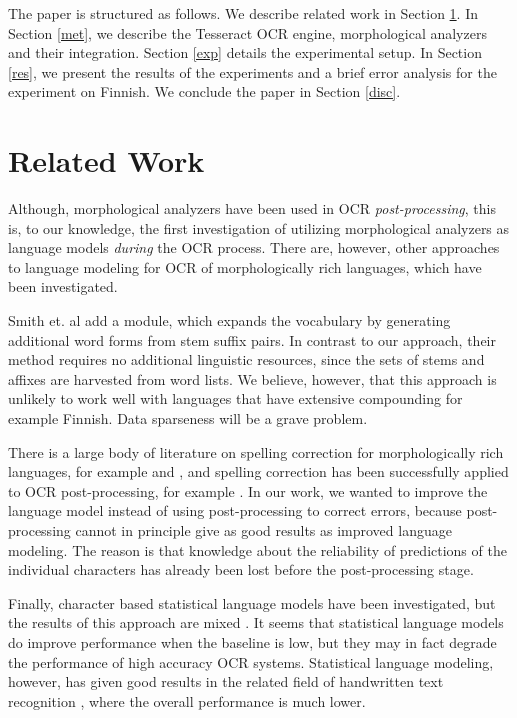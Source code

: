 \documentclass[b5paper]{article}
\begin{document}
The paper is structured as follows. We describe related work in
Section \ref{rel}. In Section \ref{met}, we describe the Tesseract OCR
engine, morphological analyzers and their integration. Section
\ref{exp} details the experimental setup. In Section \ref{res}, we
present the results of the experiments and a brief error analysis for
the experiment on Finnish. We conclude the paper in Section
\ref{disc}.

\section{Related Work}
\label{rel}
Although, morphological analyzers have been used in OCR {\it
  post-processing}, this is, to our knowledge, the first investigation
of utilizing morphological analyzers as language models {\it during}
the OCR process. There are, however, other approaches to language
modeling for OCR of morphologically rich languages, which have been
investigated.

Smith et. al \cite{smith09} add a module, which expands the vocabulary
by generating additional word forms from stem suffix pairs. In
contrast to our approach, their method requires no additional
linguistic resources, since the sets of stems and affixes are
harvested from word lists. We believe, however, that this approach is
unlikely to work well with languages that have extensive compounding
for example Finnish. Data sparseness will be a grave problem.

There is a large body of literature on spelling correction for
morphologically rich languages, for example \cite{oflazer94} and
\cite{pirinen12}, and spelling correction has been successfully
applied to OCR post-processing, for example
\cite{Takeuchi2000,Proszeky2014,Magdy2006}. In our work, we wanted to
improve the language model instead of using post-processing to correct
errors, because post-processing cannot in principle give as good
results as improved language modeling. The reason is that knowledge
about the reliability of predictions of the individual characters has
already been lost before the post-processing stage.

Finally, character based statistical language models have been
investigated, but the results of this approach are mixed
\cite{smith11}. It seems that statistical language models do improve
performance when the baseline is low, but they may in fact degrade
the performance of high accuracy OCR systems. Statistical
language modeling, however, has given good results in the related field of
handwritten text recognition \cite{marti01}, where the overall
performance is much lower.
\end{document}
